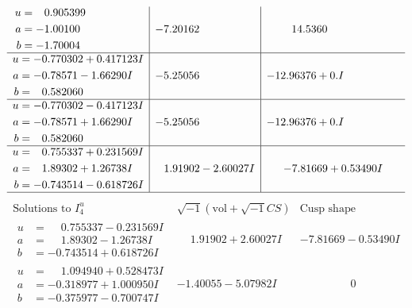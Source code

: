 \documentclass[1p]{elsarticle_modified}
\theoremstyle{definition}
\newcommand{\I}{\sqrt{-1}}
\begin{document}
$$\begin{array}{c|c|c}
\begin{aligned}
u &= \phantom{-}0.905399\phantom{ +0.000000I} \\
a &= -1.00100\phantom{ +0.000000I} \\
b &= -1.70004\phantom{ +0.000000I}\end{aligned}
 & -7.20162\phantom{ +0.000000I} & \phantom{-}14.5360\phantom{ +0.000000I} \\ \hline\begin{aligned}
u &= -0.770302 + 0.417123 I \\
a &= -0.78571 - 1.66290 I \\
b &= \phantom{-}0.582060\phantom{ +0.000000I}\end{aligned}
 & -5.25056\phantom{ +0.000000I} & -12.96376 + 0. I\phantom{ +0.000000I} \\ \hline\begin{aligned}
u &= -0.770302 - 0.417123 I \\
a &= -0.78571 + 1.66290 I \\
b &= \phantom{-}0.582060\phantom{ +0.000000I}\end{aligned}
 & -5.25056\phantom{ +0.000000I} & -12.96376 + 0. I\phantom{ +0.000000I} \\ \hline\begin{aligned}
u &= \phantom{-}0.755337 + 0.231569 I \\
a &= \phantom{-}1.89302 + 1.26738 I \\
b &= -0.743514 - 0.618726 I\end{aligned}
 & \phantom{-}1.91902 - 2.60027 I & -7.81669 + 0.53490 I\\
 \hline 
 \end{array}$$\newpage$$\begin{array}{c|c|c}  
\text{Solutions to }I^u_{4}& \I (\text{vol} + \sqrt{-1}CS) & \text{Cusp shape}\\
 \hline 
\begin{aligned}
u &= \phantom{-}0.755337 - 0.231569 I \\
a &= \phantom{-}1.89302 - 1.26738 I \\
b &= -0.743514 + 0.618726 I\end{aligned}
 & \phantom{-}1.91902 + 2.60027 I & -7.81669 - 0.53490 I \\ \hline\begin{aligned}
u &= \phantom{-}1.094940 + 0.528473 I \\
a &= -0.318977 + 1.000950 I \\
b &= -0.375977 - 0.700747 I\end{aligned}
 & -1.40055 - 5.07982 I & \phantom{-0.000000 } 0 \\ \hline\begin{aligned}

\end{aligned}
\end{array}$$
\end{document}
